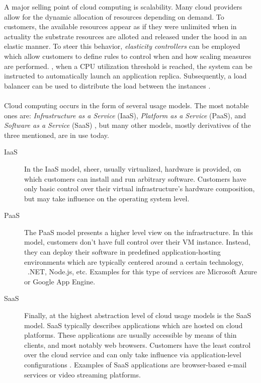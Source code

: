A major selling point of cloud computing is scalability. Many cloud providers allow for the dynamic allocation of resources depending on demand. To customers, the available resources appear as if they were unlimited when in actuality the substrate resources are alloted and released under the hood in an elastic manner. To steer this behavior, \emph{elasticity controllers} can be employed which allow customers to define rules to control when and how scaling measures are performed. \Eg , when a CPU utilization threshold is reached, the system can be instructed to automatically launch an application replica. Subsequently, a load balancer can be used to distribute the load between the instances \cite{vaquero2011dynamically}.


\paragraph{}
Cloud computing occurs in the form of several usage models. The most notable ones are: \emph{Infrastructure as a Service} (IaaS),  \emph{Platform as a Service} (PaaS), and \emph{Software as a Service} (SaaS) \cite{mell2011nist}, but many other models, mostly derivatives of the three mentioned, are in use today.

\begin{description}
\item[IaaS] In the IaaS model, sheer, usually virtualized, hardware is provided, on which customers can install and run arbitrary software. Customers have only basic control over their virtual infrastructure's hardware composition, but may take influence on the operating system level.
\item[PaaS] The PaaS model presents a higher level view on the infrastructure. In this model, customers don't have full control over their VM instance. Instead, they can deploy their software in predefined application-hosting environments \cite{mell2011nist} which are typically centered around a certain technology, \eg\ .NET, Node.js, etc. Examples for this type of services are Microsoft Azure or Google App Engine.
\item[SaaS] Finally, at the highest abstraction level of cloud usage models is the SaaS model. SaaS typically describes applications which are hosted on cloud platforms. These applications are usually accessible by means of thin clients, and most notably web browsers. Customers have the least control over the cloud service and can only take influence via application-level configurations \cite{mell2011nist}. Examples of SaaS applications are browser-based e-mail services or video streaming platforms.
\end{description}

